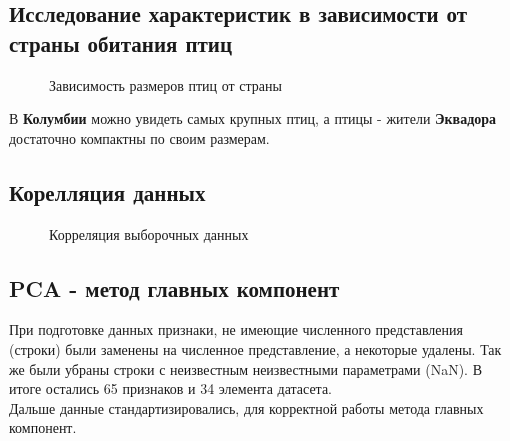 \documentclass[../body.tex]{subfiles}
\begin{document}
	\subsection{Исследование характеристик в зависимости от страны обитания птиц}
	\begin{figure}[H]
		\caption{\label{depend}Зависимость размеров птиц от страны}
	\end{figure}
В \textbf{Колумбии} можно увидеть самых крупных птиц, а птицы - жители \textbf{Эквадора} достаточно компактны по своим размерам.
\subsection{Корелляция данных}
\begin{figure}[H]
	\caption{\label{corr}Корреляция выборочных данных}
\end{figure}
\subsection{PCA - метод главных компонент}
При подготовке данных признаки, не имеющие численного представления (строки) были заменены на численное представление, а некоторые удалены. Так же были убраны строки с неизвестным неизвестными параметрами (NaN). В итоге остались 65 признаков и 34 элемента датасета.\\
Дальше данные стандартизировались, для корректной работы метода главных компонент.
\end{document}
